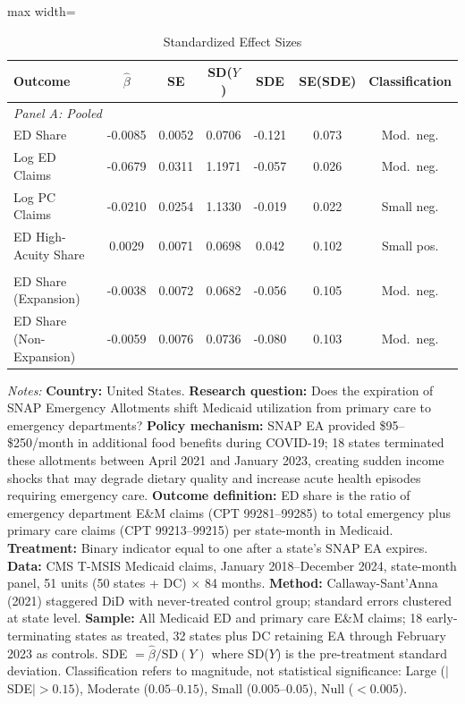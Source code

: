 \begin{table}[htbp]
\centering
\caption{Standardized Effect Sizes}
\label{tab:sde}
\begin{threeparttable}
\begin{adjustbox}{max width=\textwidth}
\begin{tabular}{@{}lcccccc@{}}
\toprule
Outcome & $\hat{\beta}$ & SE & SD($Y$) & SDE & SE(SDE) & Classification \\
\midrule
\multicolumn{7}{l}{\textit{Panel A: Pooled}} \\
\addlinespace
ED Share & -0.0085 & 0.0052 & 0.0706 & -0.121 & 0.073 & Mod.\ neg. \\
Log ED Claims & -0.0679 & 0.0311 & 1.1971 & -0.057 & 0.026 & Mod.\ neg. \\
Log PC Claims & -0.0210 & 0.0254 & 1.1330 & -0.019 & 0.022 & Small neg. \\
ED High-Acuity Share & 0.0029 & 0.0071 & 0.0698 & 0.042 & 0.102 & Small pos. \\
\addlinespace
\multicolumn{7}{l}{\textit{Panel B: Heterogeneous (Medicaid Expansion Status)}} \\
\addlinespace
ED Share (Expansion) & -0.0038 & 0.0072 & 0.0682 & -0.056 & 0.105 & Mod.\ neg. \\
ED Share (Non-Expansion) & -0.0059 & 0.0076 & 0.0736 & -0.080 & 0.103 & Mod.\ neg. \\
\bottomrule
\end{tabular}
\end{adjustbox}
\begin{tablenotes}[flushleft]\footnotesize\sloppy
\item \textit{Notes:} \textbf{Country:} United States. \textbf{Research question:} Does the expiration of SNAP Emergency Allotments shift Medicaid utilization from primary care to emergency departments? \textbf{Policy mechanism:} SNAP EA provided \$95--\$250/month in additional food benefits during COVID-19; 18 states terminated these allotments between April 2021 and January 2023, creating sudden income shocks that may degrade dietary quality and increase acute health episodes requiring emergency care. \textbf{Outcome definition:} ED share is the ratio of emergency department E\&M claims (CPT 99281--99285) to total emergency plus primary care claims (CPT 99213--99215) per state-month in Medicaid. \textbf{Treatment:} Binary indicator equal to one after a state's SNAP EA expires. \textbf{Data:} CMS T-MSIS Medicaid claims, January 2018--December 2024, state-month panel, 51 units (50 states + DC) $\times$ 84 months. \textbf{Method:} Callaway-Sant'Anna (2021) staggered DiD with never-treated control group; standard errors clustered at state level. \textbf{Sample:} All Medicaid ED and primary care E\&M claims; 18 early-terminating states as treated, 32 states plus DC retaining EA through February 2023 as controls. SDE $= \hat{\beta} / \text{SD}(Y)$ where SD($Y$) is the pre-treatment standard deviation. Classification refers to magnitude, not statistical significance: Large ($|$SDE$| > 0.15$), Moderate ($0.05$--$0.15$), Small ($0.005$--$0.05$), Null ($< 0.005$).
\end{tablenotes}
\end{threeparttable}
\end{table}

